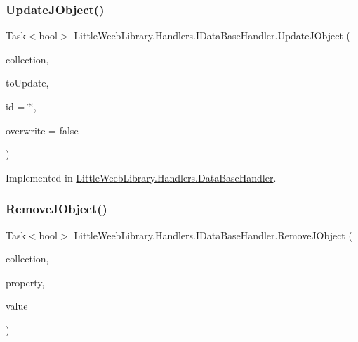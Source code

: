 \subsubsection{\texorpdfstring{Update\+J\+Object()}{UpdateJObject()}\hspace{0.1cm}{\footnotesize\ttfamily [2/2]}}
{\footnotesize\ttfamily Task$<$bool$>$ Little\+Weeb\+Library.\+Handlers.\+I\+Data\+Base\+Handler.\+Update\+J\+Object (\begin{DoxyParamCaption}\item[{string}]{collection,  }\item[{J\+Object}]{to\+Update,  }\item[{string}]{id = {\ttfamily \char`\"{}\char`\"{}},  }\item[{bool}]{overwrite = {\ttfamily false} }\end{DoxyParamCaption})}



Implemented in \mbox{\hyperlink{class_little_weeb_library_1_1_handlers_1_1_data_base_handler_a9b2223ff71f688234f95d247ea3b5739}{Little\+Weeb\+Library.\+Handlers.\+Data\+Base\+Handler}}.

\mbox{\label{interface_little_weeb_library_1_1_handlers_1_1_i_data_base_handler_a76b8da1f75749b16e095dc3d635cebdf}} 
\subsubsection{\texorpdfstring{Remove\+J\+Object()}{RemoveJObject()}\hspace{0.1cm}{\footnotesize\ttfamily [1/2]}}
{\footnotesize\ttfamily Task$<$bool$>$ Little\+Weeb\+Library.\+Handlers.\+I\+Data\+Base\+Handler.\+Remove\+J\+Object (\begin{DoxyParamCaption}\item[{string}]{collection,  }\item[{string}]{property,  }\item[{string}]{value }\end{DoxyParamCaption})}



